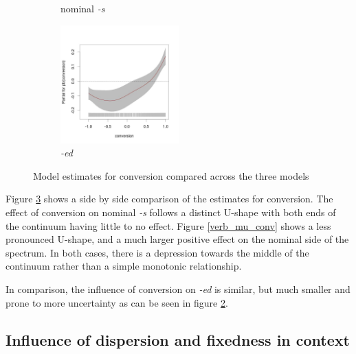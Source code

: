 \documentclass[
]{article}
\begin{document}
\begin{figure}[t!]
\begin{subfigure}[b]{0.49\textwidth}
         \caption{nominal \textit{-s}}
         \label{noun_mu_conv}
     \end{subfigure}
     \begin{subfigure}[b]{\textwidth}
         \centering
         \includegraphics[width=0.5\textwidth]{figures/m_ed_mu_conversion.jpg}
         \caption{\textit{-ed}}
         \label{ed_mu_conv}
     \end{subfigure}
        \caption{Model estimates for conversion compared across the three models}
        \label{conv_pair}
\end{figure}

Figure \ref{conv_pair} shows a side by side comparison of the estimates
for conversion. The effect of conversion on nominal \emph{-s} follows a
distinct U-shape with both ends of the continuum having little to no
effect. Figure \ref{verb_mu_conv} shows a less pronounced U-shape, and a
much larger positive effect on the nominal side of the spectrum. In both
cases, there is a depression towards the middle of the continuum rather
than a simple monotonic relationship.

In comparison, the influence of conversion on \emph{-ed} is similar, but
much smaller and prone to more uncertainty as can be seen in figure
\ref{ed_mu_conv}.

\hypertarget{influence-of-dispersion-and-fixedness-in-context}{%
\subsection{Influence of dispersion and fixedness in
context}\label{influence-of-dispersion-and-fixedness-in-context}}
\end{document}
